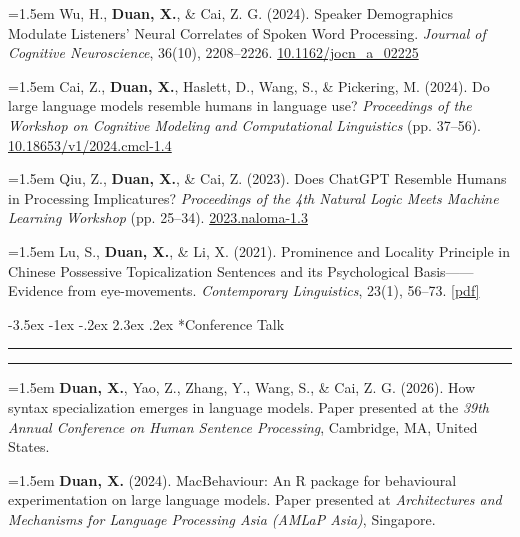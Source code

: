 \documentclass[11pt,a4paper]{article}
\makeatletter
\renewcommand\section{\@startsection{section}{1}{\z@}%
  {-3.5ex \@plus -1ex \@minus -.2ex}%
  {2.3ex \@plus.2ex}%
  {\normalfont\normalsize\bfseries}}
\makeatother
\begin{document}
\hangindent=1.5em  Wu, H., \textbf{Duan, X.}, \& Cai, Z. G. (2024). Speaker Demographics Modulate Listeners' Neural Correlates of Spoken Word Processing. \textit{Journal of Cognitive Neuroscience}, 36(10), 2208–2226. \href{https://doi.org/10.1162/jocn_a_02225}{10.1162/jocn_a_02225}

\hangindent=1.5em  Cai, Z., \textbf{Duan, X.}, Haslett, D., Wang, S., \& Pickering, M. (2024). Do large language models resemble humans in language use? \textit{Proceedings of the Workshop on Cognitive Modeling and Computational Linguistics} (pp. 37–56). \href{https://doi.org/10.18653/v1/2024.cmcl-1.4}{10.18653/v1/2024.cmcl-1.4}

\hangindent=1.5em  Qiu, Z., \textbf{Duan, X.}, \& Cai, Z. (2023). Does ChatGPT Resemble Humans in Processing Implicatures? \textit{Proceedings of the 4th Natural Logic Meets Machine Learning Workshop} (pp. 25–34). \href{https://aclanthology.org/2023.naloma-1.3/}{2023.naloma-1.3}

\hangindent=1.5em  Lu, S., \textbf{Duan, X.}, \& Li, X. (2021). Prominence and Locality Principle in Chinese Possessive Topicalization Sentences and its Psychological Basis——Evidence from eye-movements. \textit{Contemporary Linguistics}, 23(1), 56–73. \href{https://www.dropbox.com/scl/fi/4ga7a5ssslaed72hx3i2v/Prominence-and-Locality-Principle-in-Chinese-Possessive-Topicalization-Sentences.pdf?rlkey=7rtvpqolr2xs6rtlychdtatwb&st=672mpgkb&dl=0}{[pdf]}


\vspace{-1.5em} 
\section*{Conference Talk}
\vspace{-.5em}
\hrule
\vspace{0.3ex} 
\hrule

\hangindent=1.5em  \textbf{Duan, X.}, Yao, Z., Zhang, Y., Wang, S., \& Cai, Z. G. (2026). How syntax specialization emerges in language models. Paper presented at the \textit{39th Annual Conference on Human Sentence Processing}, Cambridge, MA, United States.

\hangindent=1.5em  \textbf{Duan, X.} (2024). MacBehaviour: An R package for behavioural experimentation on large language models. Paper presented at \textit{Architectures and Mechanisms for Language Processing Asia (AMLaP Asia)}, Singapore.
\end{document}
